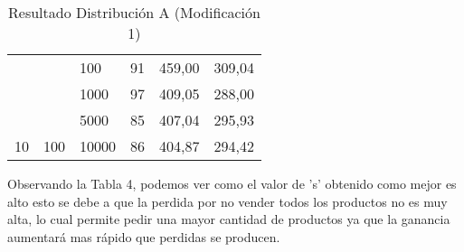 \documentclass{article}
\begin{document}
\begin{table}[h]
\begin{tabular}{llllll}
			\multicolumn{1}{|l|}{}                                                 & \multicolumn{1}{l|}{}                                                 & \multicolumn{1}{l|}{100}                                                  & \multicolumn{1}{l|}{91}                                                      & \multicolumn{1}{l|}{459,00}                                                         & \multicolumn{1}{l|}{309,04}                                                           \\ \cline{3-6} 
			\multicolumn{1}{|l|}{}                                                 & \multicolumn{1}{l|}{}                                                 & \multicolumn{1}{l|}{1000}                                                 & \multicolumn{1}{l|}{97}                                                      & \multicolumn{1}{l|}{409,05}                                                         & \multicolumn{1}{l|}{288,00}                                                           \\ \cline{3-6} 
			\multicolumn{1}{|l|}{}                                                 & \multicolumn{1}{l|}{}                                                 & \multicolumn{1}{l|}{5000}                                                 & \multicolumn{1}{l|}{85}                                                      & \multicolumn{1}{l|}{407,04}                                                         & \multicolumn{1}{l|}{295,93}                                                           \\ \cline{3-6} 
			\multicolumn{1}{|l|}{\multirow{-4}{*}{10}}                             & \multicolumn{1}{l|}{\multirow{-4}{*}{100}}                            & \multicolumn{1}{l|}{10000}                                                & \multicolumn{1}{l|}{86}                                                      & \multicolumn{1}{l|}{404,87}                                                         & \multicolumn{1}{l|}{294,42}                                                           \\ \hline
		\end{tabular}
	\caption{Resultado Distribución A (Modificación 1)}
	\end{table}

	Observando la Tabla 4, podemos ver como el valor de 's' obtenido como mejor es alto esto se debe a que la perdida por no vender todos los productos no es muy alta, lo cual permite pedir una mayor cantidad de productos ya que la ganancia aumentará mas rápido que perdidas se producen. 
\end{document}
